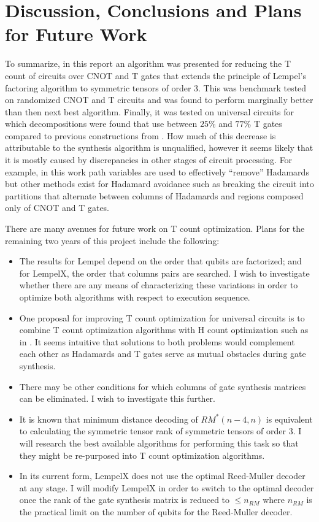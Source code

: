 \documentclass{article}
\theoremstyle{definition}
\theoremstyle{problem}
\theoremstyle{lemma}
\begin{document}
			\FloatBarrier
			\section{Discussion, Conclusions and Plans for Future Work}
			\label{s6_Discussion}
			
			To summarize, in this report an algorithm was presented for reducing the T count of circuits over CNOT and T gates that extends the principle of Lempel's factoring algorithm to symmetric tensors of order 3. This was benchmark tested on randomized CNOT and T circuits and was found to perform marginally better than then next best algorithm. Finally, it was tested on universal circuits for which decompositions were found that use between $25\%$ and $77\%$ T gates compared to previous constructions from \cite{8_Amy_2016}. How much of this decrease is attributable to the synthesis algorithm is unqualified, however it seems likely that it is mostly caused by discrepancies in other stages of circuit processing. For example, in this work path variables are used to effectively ``remove'' Hadamards but other methods exist for Hadamard avoidance such as breaking the circuit into partitions that alternate between columns of Hadamards and regions composed only of CNOT and T gates.
			
			There are many avenues for future work on T count optimization. Plans for the remaining two years of this project include the following:
			\begin{itemize}
				\item The results for Lempel depend on the order that qubits are factorized; and for LempelX, the order that columns pairs are searched. I wish to investigate whether there are any means of characterizing these variations in order to optimize both algorithms with respect to execution sequence.
				\item One proposal for improving T count optimization for universal circuits is to combine T count optimization algorithms with H count optimization such as in \cite{Abdessaied2014}. It seems intuitive that solutions to both problems would complement each other as Hadamards and T gates serve as mutual obstacles during gate synthesis.
				\item There may be other conditions for which columns of gate synthesis matrices can be eliminated. I wish to investigate this further.
				\item It is known that minimum distance decoding of $RM^*(n-4,n)$ is equivalent to calculating the symmetric tensor rank of symmetric tensors of order 3. I will research the best available algorithms for performing this task so that they might be re-purposed into T count optimization algorithms.
				\item In its current form, LempelX does not use the optimal Reed-Muller decoder at any stage. I will modify LempelX in order to switch to the optimal decoder once the rank of the gate synthesis matrix is reduced to $\leq n_{RM}$ where $n_{RM}$ is the practical limit on the number of qubits for the Reed-Muller decoder.
			\end{itemize}
			
\end{document}
